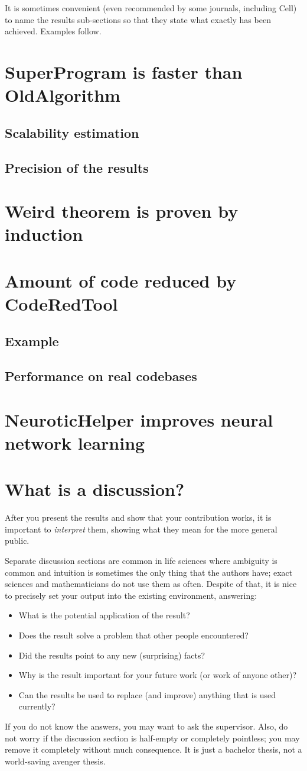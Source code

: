 It is sometimes convenient (even recommended by some journals, including Cell) to name the results sub-sections so that they state what exactly has been achieved. Examples follow.

\section{SuperProgram is faster than OldAlgorithm}
\subsection{Scalability estimation}
\subsection{Precision of the results}
\section{Weird theorem is proven by induction}
\section{Amount of code reduced by CodeRedTool}
\subsection{Example}
\subsection{Performance on real codebases}
\section{NeuroticHelper improves neural network learning}

\section{What is a discussion?}
After you present the results and show that your contribution works, it is important to \emph{interpret} them, showing what they mean for the more general public.

Separate discussion sections are common in life sciences where ambiguity is common and intuition is sometimes the only thing that the authors have; exact sciences and mathematicians do not use them as often. Despite of that, it is nice to precisely set your output into the existing environment, answering:
\begin{itemize}
\item What is the potential application of the result?
\item Does the result solve a problem that other people encountered?
\item Did the results point to any new (surprising) facts?
\item Why is the result important for your future work (or work of anyone other)?
\item Can the results be used to replace (and improve) anything that is used currently?
\end{itemize}

If you do not know the answers, you may want to ask the supervisor. Also, do not worry if the discussion section is half-empty or completely pointless; you may remove it completely without much consequence. It is just a bachelor thesis, not a world-saving avenger thesis.
